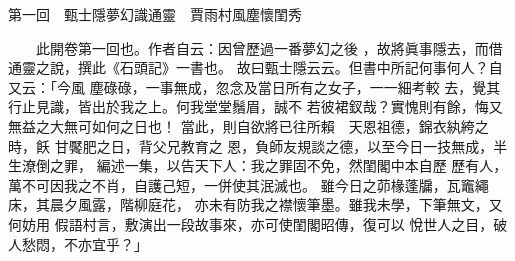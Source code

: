 \documentclass[横,禁則,名前]{genkou}
\newcommand{\heiti}{\upmhm}
\begin{document}
{ \par \noindent \heiti
第一回　甄士隱夢幻識通靈　賈雨村風塵懷閨秀
}

\usong

　　此開卷第一回也。作者自云：因曾歷過一番夢幻之後
，故將眞事隱去，而借通靈之說，撰此《石頭記》一書也。
故曰甄士隱云云。但書中所記何事何人？自又云：「今風
塵碌碌，一事無成，忽念及當日所有之女子，一一細考較
去，覺其行止見識，皆出於我之上。何我堂堂鬚眉，誠不
若彼裙釵哉？實愧則有餘，悔又無益之大無可如何之日也！
當此，則自欲將已往所賴　天恩祖德，錦衣紈絝之時，飫
甘饜肥之日，背父兄教育之
恩，負師友規談之德，以至今日一技無成，半生潦倒之罪，
編述一集，以告天下人：我之罪固不免，然閨閣中本自歷
歷有人，萬不可因我之不肖，自護己短，一併使其泯滅也。
雖今日之茆椽蓬牖，瓦竈繩床，其晨夕風露，階柳庭花，
亦未有防我之襟懷筆墨。雖我未學，下筆無文，又何妨用
假語村言，敷演出一段故事來，亦可使閨閣昭傳，復可以
悅世人之目，破人愁悶，不亦宜乎？」
\end{document}
